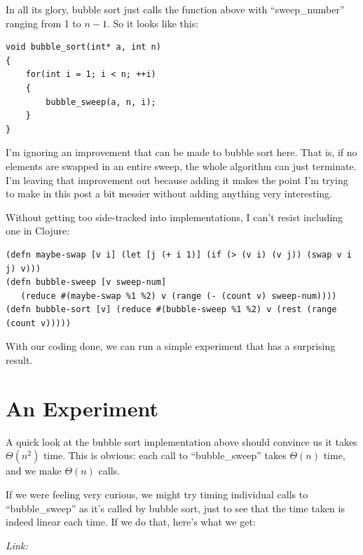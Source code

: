 \documentclass[11pt]{article}
\begin{document}
In all its glory, bubble sort just calls the function above with ``sweep\_number'' ranging from 1 to $n - 1$. So it looks like this:

\begin{lstlisting}
void bubble_sort(int* a, int n)
{
    for(int i = 1; i < n; ++i)
    {
        bubble_sweep(a, n, i);
    }
}
\end{lstlisting}

I'm ignoring an improvement that can be made to bubble sort here. That is, if no elements are swapped in an entire sweep, the whole algorithm can just terminate. I'm leaving that improvement out because adding it makes the point I'm trying to make in this post a bit messier without adding anything very interesting.

Without getting too side-tracked into implementations, I can't resist including one in Clojure:
\begin{lstlisting}
(defn maybe-swap [v i] (let [j (+ i 1)] (if (> (v i) (v j)) (swap v i j) v)))
(defn bubble-sweep [v sweep-num] 
   (reduce #(maybe-swap %1 %2) v (range (- (count v) sweep-num))))
(defn bubble-sort [v] (reduce #(bubble-sweep %1 %2) v (rest (range (count v)))))
\end{lstlisting}

With our coding done, we can run a simple experiment that has a surprising result.

\section{An Experiment}

A quick look at the bubble sort implementation above should convince us it takes $\Theta(n^2)$ time. This is obvious: each call to ``bubble\_sweep'' takes $\Theta(n)$ time, and we make $\Theta(n)$ calls.

If we were feeling very curious, we might try timing individual calls to ``bubble\_sweep'' as it's called by bubble sort, just to see that the time taken is indeed linear each time. If we do that, here's what we get:

\begin{center}\end{center}

\textit{Link: }\texttt{}
\end{document}
